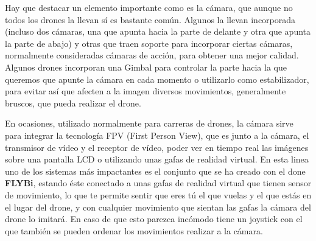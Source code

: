 \hspace{1 cm} Hay que destacar un elemento importante como es la c\'amara, que aunque no todos los drones la llevan s\'i es bastante com\'un. Algunos la llevan incorporada (incluso dos c\'amaras, una que apunta hacia la parte de delante y otra que apunta la parte de abajo) y otras que traen soporte para incorporar ciertas c\'amaras, normalmente consideradas c\'amaras de acci\'on, para obtener una mejor calidad. Algunos drones incorporan una Gimbal para controlar la parte hacia la que queremos que apunte la c\'amara en cada momento o utilizarlo como estabilizador, para evitar as\'i que afecten a la imagen diversos movimientos, generalmente bruscos, que pueda realizar el drone. 

\hspace{1 cm} En ocasiones, utilizado normalmente para carreras de drones, la c\'amara sirve para integrar la tecnolog\'ia FPV (First Person View), que es junto a la c\'amara, el transmisor de v\'ideo y el receptor de v\'ideo, poder ver en tiempo real las im\'agenes sobre una pantalla LCD o utilizando unas gafas de realidad virtual. En esta linea uno de los sistemas m\'as impactantes es el conjunto que se ha creado con el done \textbf{FLYBi}, estando \'este conectado a unas gafas de realidad virtual que tienen sensor de movimiento, lo que te permite sentir que eres t\'u el que vuelas y el que est\'as en el lugar del drone, y con cualquier movimiento que sientan las gafas la c\'amara del drone lo imitar\'a. En caso de que esto parezca inc\'omodo tiene un joystick con el que tambi\'en se pueden ordenar los movimientos realizar a la c\'amara. 
 

